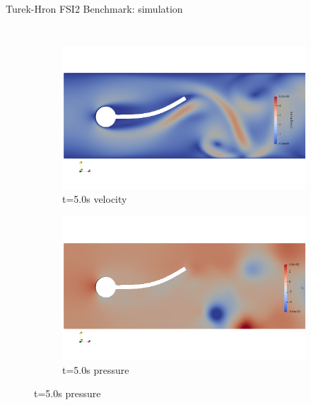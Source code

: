 \documentclass[10pt,t]{beamer}
\begin{document}
\begin{frame}{Turek-Hron FSI2 Benchmark: simulation}

\begin{columns}


\begin{figure}[htb]
\centering %
\begin{subfigure}{0.5\textwidth}
  \includegraphics[width=\linewidth, trim=0 120 0 120, clip]{images/FSI2/fsi2_v1.png}
  \caption{t=5.0s velocity}
  \label{fig:fsi2_v1}
\end{subfigure}\hfil %
\begin{subfigure}{0.5\textwidth}
  \includegraphics[width=\linewidth, trim=0 120 0 120, clip]{images/FSI2/fsi2_p1.png}
  \caption{t=5.0s pressure}
  \label{fig:fsi2_p1}
\end{subfigure}\hfil %

\medskip


\end{figure}
\end{columns}
\end{frame}
\end{document}
